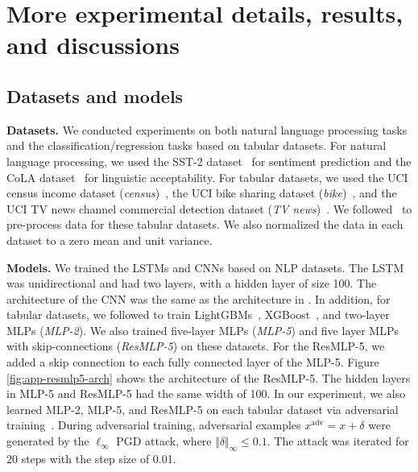 \section{More experimental details, results, and discussions}
\label{sec:app-experiment details}

\subsection{Datasets and models}
\label{sec:app-dataset-models}

\textbf{Datasets.}
We conducted experiments on both natural language processing tasks and the classification/regression tasks based on tabular datasets.
For natural language processing, we used the SST-2 dataset~\cite{socher2013recursive} for sentiment prediction and the CoLA dataset~\cite{warstadt2019neural} for linguistic acceptability.
For tabular datasets, we used the UCI census income dataset (\textit{census})~\cite{Dua:2019}, the UCI bike sharing dataset (\textit{bike})~\cite{Dua:2019}, and the UCI TV news channel commercial detection dataset (\textit{TV news})~\cite{Dua:2019}.
We followed~\cite{covert2020understanding,covert2021improving} to pre-process data for these tabular datasets.
We also normalized the data in each dataset to a zero mean and unit variance.

\textbf{Models.}
We trained the LSTMs and CNNs based on NLP datasets.
The LSTM was unidirectional and had two layers, with a hidden layer of size 100.
The architecture of the CNN was the same as the architecture in \cite{rakhlin2016convolutional}.
In addition, for tabular datasets, we followed \cite{covert2020understanding,covert2021improving} to train LightGBMs~\cite{ke2017lightgbm}, XGBoost~\cite{chen2016xgboost}, and two-layer MLPs (\textit{MLP-2}).
We also trained five-layer MLPs (\textit{MLP-5}) and five layer MLPs with skip-connections (\textit{ResMLP-5}) on these datasets.
For the ResMLP-5, we added a skip connection to each fully connected layer of the MLP-5.
Figure \ref{fig:app-resmlp5-arch} shows the architecture of the ResMLP-5.
The hidden layers in MLP-5 and ResMLP-5 had the same width of 100.
In our experiment, we also learned MLP-2, MLP-5, and ResMLP-5 on each tabular dataset via adversarial training~\cite{madry2018towards}.
During adversarial training, adversarial examples {\small $x^{\text{adv}}=x+\delta$} were generated by the {\small $\ell_{\infty}$} PGD attack, where {\small $\Vert\delta\Vert_{\infty}\le 0.1$}.
The attack was iterated for 20 steps with the step size of 0.01.

